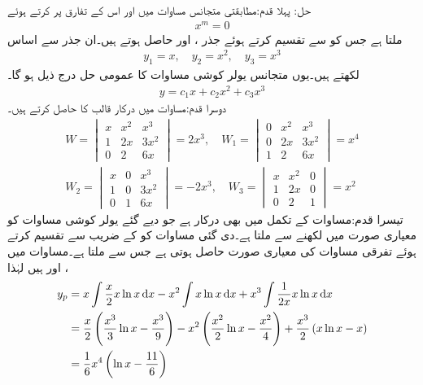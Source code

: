 حل: پہلا قدم:\quad مطابقتی متجانس مساوات میں  اور اس کے تفارق  پر کرتے ہوئے
\begin{align*}
[m(m-1)(m-1)-3m(m-1)+6m-6]x^m=0
\end{align*}
ملتا ہے جس کو  سے تقسیم کرتے ہوئے  جذر ،  اور  حاصل ہوتے ہیں۔ان جذر سے اساس
\begin{align*}
y_1=x, \quad y_2=x^2,\quad y_3=x^3
\end{align*}
لکھتے ہیں۔یوں متجانس یولر کوشی مساوات کا عمومی حل درج ذیل ہو گا۔
\begin{align*}
y=c_1x+c_2x^2+c_3x^3
\end{align*}
دوسرا قدم:\quad مساوات  میں درکار قالب کا  حاصل کرتے ہیں۔
\begin{align*}
W=
\begin{vmatrix}
x & x^2 & x^3\\
1 & 2x & 3x^2\\
0 & 2 &  6x
\end{vmatrix}=2x^3, \quad
W_1=
\begin{vmatrix}
0 & x^2 & x^3\\
0 & 2x & 3x^2\\
1 & 2 &  6x
\end{vmatrix}=x^4\\
W_2=
\begin{vmatrix}
x & 0 & x^3\\
1 & 0 & 3x^2\\
0 & 1 &  6x
\end{vmatrix}=-2x^3, \quad
W_3=
\begin{vmatrix}
x & x^2 &0\\
1 & 2x & 0\\
0 & 2 &  1
\end{vmatrix}=x^2
\end{align*}
تیسرا قدم:\quad مساوات  کے تکمل میں  بھی درکار ہے جو دیے گئے یولر کوشی مساوات کو معیاری صورت میں لکھنے سے ملتا ہے۔دی گئی مساوات کو  کے  ضریب    سے تقسیم کرتے ہوئے تفرقی مساوات کی معیاری صورت حاصل ہوتی ہے جس سے  ملتا ہے۔مساوات   میں ،  اور
  ہیں لہٰذا 
\begin{align*}
y_p&=x\int \frac{x}{2} x\ln x \dif x-x^2\int x\ln x \dif x+x^3\int \frac{1}{2x} x\ln x \dif x\\
&=\frac{x}{2}\left(\frac{x^3}{3}\ln x -\frac{x^3}{9}\right)-x^2\left(\frac{x^2}{2}\ln x-\frac{x^2}{4}\right)+\frac{x^3}{2}\left(x\ln x-x\right)\\
&=\frac{1}{6}x^4\left(\ln x-\frac{11}{6}\right)
\end{align*}
